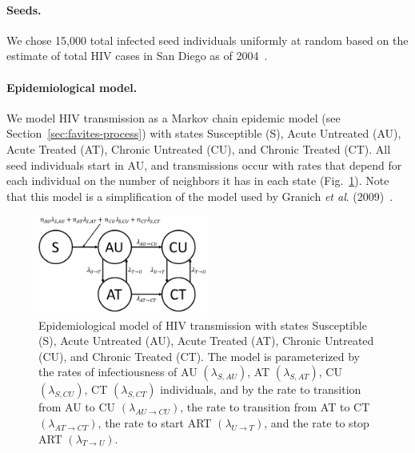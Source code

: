 \paragraph{Seeds.} We chose 15,000 total infected seed individuals uniformly at random based on the estimate of total \gls{HIV} cases in San Diego as of 2004~\cite{Macchione2015}.

\paragraph{Epidemiological model.} We model \gls{HIV} transmission as a Markov chain epidemic model (see Section~\ref{sec:favites-process}) with states Susceptible (S), Acute Untreated (AU), Acute Treated (AT), Chronic Untreated (CU), and Chronic Treated (CT). All seed individuals start in AU, and transmissions occur with rates that depend for each individual on the number of neighbors it has in each state (Fig.~\ref{fig:favites-model}). Note that this model is a simplification of the model used by Granich \textit{et al}. (2009)~\cite{Granich2009}.

\begin{figure} %
\centering
\includegraphics[width=0.5\textwidth]{figs/favites-model}
\caption[FAVITES Model]
{Epidemiological model of \gls{HIV} transmission with states Susceptible (S), Acute Untreated (AU), Acute Treated (AT), Chronic Untreated (CU), and Chronic Treated (CT). The model is parameterized by the rates of infectiousness of AU $(\lambda_{S,AU})$,  AT $(\lambda_{S,AT})$, CU $(\lambda_{S,CU})$, CT $(\lambda_{S,CT})$ individuals, and by the rate to transition from AU to CU $(\lambda_{AU \rightarrow CU})$, the rate to transition from AT to CT $(\lambda_{AT \rightarrow CT})$, the rate to start \gls{ART} $(\lambda_{U \rightarrow T})$, and the rate to stop ART $(\lambda_{T \rightarrow U})$.}
\label{fig:favites-model}
\end{figure}

